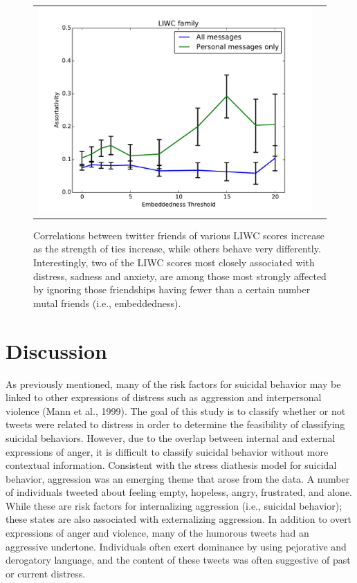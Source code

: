 \documentclass[11pt]{article}
\begin{document}
\begin{figure}
\begin{tabular}{cc}
\includegraphics[scale=.2]{family_corr.pdf}
\end{tabular}
  \caption{Correlations between twitter friends of various LIWC scores increase as the strength of ties increase, while others behave very differently. Interestingly, two of the LIWC scores most closely associated with distress, sadness and anxiety, are among those most strongly affected by ignoring those friendships having fewer than a certain number mutal friends (i.e., embeddedness).}
\end{figure}


\section{Discussion}

As previously mentioned, many of the risk factors for suicidal behavior may be linked to other expressions of distress such as aggression and interpersonal violence (Mann et al., 1999).  The goal of this study is to classify whether or not tweets were related to distress in order to determine the feasibility of classifying suicidal behaviors.  However, due to the overlap between internal and external expressions of anger, it is difficult to classify suicidal behavior without more contextual information.  Consistent with the stress diathesis model for suicidal behavior, aggression was an emerging theme that arose from the data. A number of individuals tweeted about feeling empty, hopeless, angry, frustrated, and alone.  While these are risk factors for internalizing aggression (i.e., suicidal behavior); these states are also associated with externalizing aggression.  In addition to overt expressions of anger and violence, many of the humorous tweets had an aggressive undertone.  Individuals often exert dominance by using pejorative and derogatory language, and the content of these tweets was often suggestive of past or current distress.  
\end{document}
